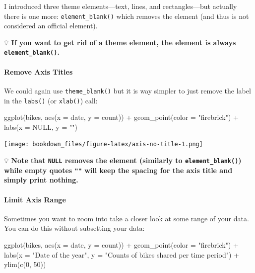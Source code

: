\documentclass[
]{krantz}
\makeatletter
\newenvironment{Shaded}{\begin{snugshade}}{\end{snugshade}}
\newcommand{\AttributeTok}[1]{\textcolor[rgb]{0.61,0.61,0.61}{#1}}
\newcommand{\ConstantTok}[1]{\textcolor[rgb]{0,0,0}{#1}}
\newcommand{\DecValTok}[1]{\textcolor[rgb]{0.06,0.06,0.06}{#1}}
\newcommand{\FunctionTok}[1]{\textcolor[rgb]{0,0,0}{#1}}
\newcommand{\NormalTok}[1]{#1}
\newcommand{\SpecialCharTok}[1]{\textcolor[rgb]{0,0,0}{#1}}
\newcommand{\StringTok}[1]{\textcolor[rgb]{0.5,0.5,0.5}{#1}}
\newenvironment{kframe}{%
\medskip{}
\setlength{\fboxsep}{.8em}
 \def\at@end@of@kframe{}%
 \ifinner\ifhmode%
  \def\at@end@of@kframe{\end{minipage}}%
  \begin{minipage}{\columnwidth}%
 \fi\fi%
 \def\FrameCommand##1{\hskip\@totalleftmargin \hskip-\fboxsep
 \colorbox{shadecolor}{##1}\hskip-\fboxsep
     \hskip-\linewidth \hskip-\@totalleftmargin \hskip\columnwidth}%
 \MakeFramed {\advance\hsize-\width
   \@totalleftmargin\z@ \linewidth\hsize
   \@setminipage}}%
 {\par\unskip\endMakeFramed%
 \at@end@of@kframe}
\renewenvironment{Shaded}{\begin{kframe}}{\end{kframe}}
\makeatother
\begin{document}
I introduced three theme elements---text, lines, and rectangles---but actually there is one more: \texttt{element\_blank()} which removes the element (and thus is not considered an official element).

💡 \textbf{If you want to get rid of a theme element, the element is always \texttt{element\_blank()}.}

\hypertarget{remove-axis-titles}{%
\paragraph{Remove Axis Titles}\label{remove-axis-titles}}

We could again use \texttt{theme\_blank()} but it is way simpler to just remove the label in the \texttt{labs()} (or \texttt{xlab()}) call:

\begin{Shaded}
\begin{Highlighting}[]
\FunctionTok{ggplot}\NormalTok{(bikes, }\FunctionTok{aes}\NormalTok{(}\AttributeTok{x =}\NormalTok{ date, }\AttributeTok{y =}\NormalTok{ count)) }\SpecialCharTok{+}
  \FunctionTok{geom\_point}\NormalTok{(}\AttributeTok{color =} \StringTok{"firebrick"}\NormalTok{) }\SpecialCharTok{+}
  \FunctionTok{labs}\NormalTok{(}\AttributeTok{x =} \ConstantTok{NULL}\NormalTok{, }\AttributeTok{y =} \StringTok{""}\NormalTok{)}
\end{Highlighting}
\end{Shaded}

\texttt{[image: bookdown\_files/figure-latex/axis-no-title-1.png]}

💡 \textbf{Note that \texttt{NULL} removes the element (similarly to \texttt{element\_blank()}) while empty quotes \texttt{""} will keep the spacing for the axis title and simply print nothing.}

\hypertarget{limit-axis-range}{%
\paragraph{Limit Axis Range}\label{limit-axis-range}}

Sometimes you want to zoom into take a closer look at some range of your data. You can do this without subsetting your data:

\begin{Shaded}
\begin{Highlighting}[]
\FunctionTok{ggplot}\NormalTok{(bikes, }\FunctionTok{aes}\NormalTok{(}\AttributeTok{x =}\NormalTok{ date, }\AttributeTok{y =}\NormalTok{ count)) }\SpecialCharTok{+}
  \FunctionTok{geom\_point}\NormalTok{(}\AttributeTok{color =} \StringTok{"firebrick"}\NormalTok{) }\SpecialCharTok{+}
  \FunctionTok{labs}\NormalTok{(}\AttributeTok{x =} \StringTok{"Date of the year"}\NormalTok{, }
       \AttributeTok{y =} \StringTok{"Counts of bikes shared per time period"}\NormalTok{) }\SpecialCharTok{+}
  \FunctionTok{ylim}\NormalTok{(}\FunctionTok{c}\NormalTok{(}\DecValTok{0}\NormalTok{, }\DecValTok{50}\NormalTok{))}
\end{Highlighting}
\end{Shaded}
\end{document}
